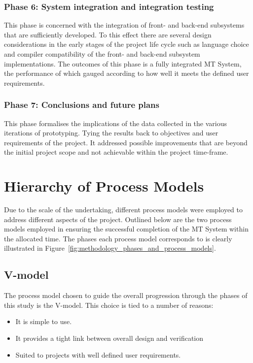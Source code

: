 \subsubsection{Phase 6: System integration and integration testing}
This phase is concerned with the integration of front- and back-end subsystems that
are sufficiently developed. To this effect there are several design
considerations in the early stages of the project life cycle such
as language choice and compiler compatibility of the front- and back-end
subsystem implementations. The outcomes of this phase is a fully integrated MT
System, the performance of which gauged according to how well it meets the
defined user requirements.  

\subsubsection{Phase 7: Conclusions and future plans}
This phase formalises the implications of the data collected in the various
iterations of prototyping. Tying the results back to objectives and user
requirements of the project.
It addressed possible improvements that are beyond the initial project scope
and not achievable within the project time-frame.

\section{Hierarchy of Process Models}
Due to the scale of the undertaking, different process models were employed to
address different aspects of the project.
Outlined below are the two process models employed in ensuring the
successful completion of the MT System within the allocated time. The phases
each process model corresponds to is clearly illustrated in
Figure~\ref{fig:methodology_phases_and_process_models}. 

\subsection{V-model}
The process model chosen to guide the overall progression through the phases of
this study is the V-model. This choice is tied to a number of reasons: 
\begin{itemize}
    \item It is simple to use.
    \item It provides a tight link between overall design and verification 
    \item Suited to projects with well defined user requirements.
\end{itemize}

